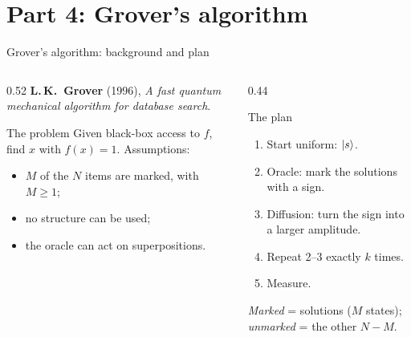 \documentclass[aspectratio=169,11pt]{beamer}
\newcommand{\key}[1]{{\color{qdark}\textbf{#1}}}
\begin{document}
\section{Part 4: Grover's algorithm}
\begin{frame}{Grover's algorithm: background and plan}
  \begin{columns}[T]
    \begin{column}{0.52\textwidth}
      \key{L.\,K.\ Grover} (1996), \emph{A fast quantum mechanical algorithm for database search}.\\[2mm]
      \begin{block}{The problem}
        Given black-box access to $f$, find $x$ with $f(x) = 1$. Assumptions:
        \begin{itemize}
          \item $M$ of the $N$ items are marked, with $M \ge 1$;
          \item no structure can be used;
          \item the oracle can act on superpositions.
        \end{itemize}
      \end{block}
    \end{column}
    \begin{column}{0.44\textwidth}
      \begin{exampleblock}{The plan}
        \begin{enumerate}
          \item Start uniform: $\ket{s}$.
          \item Oracle: mark the solutions with a sign.
          \item Diffusion: turn the sign into a larger amplitude.
          \item Repeat 2--3 exactly $k$ times.
          \item Measure.
        \end{enumerate}
      \end{exampleblock}
      \small \emph{Marked} = solutions ($M$ states); \emph{unmarked} = the other $N - M$.
    \end{column}
  \end{columns}
\end{frame}
\end{document}
